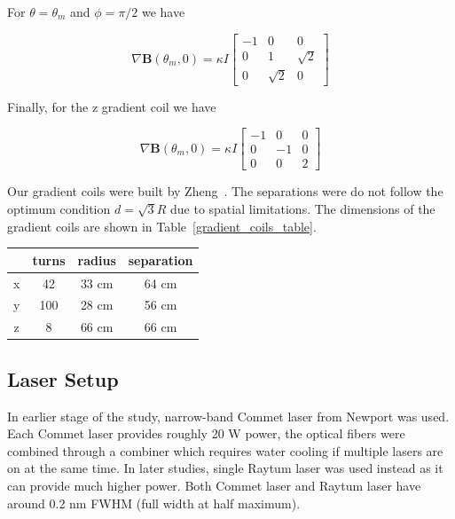 For $\theta=\theta_m$ and $\phi=\pi/2$ we have

\begin{equation}
\nabla\boldsymbol{B}(\theta_m, 0)=\kappa I
\begin{bmatrix}
-1 & 0 & 0\\
0 & 1 & \sqrt{2}\\
0 & \sqrt{2} & 0
\end{bmatrix}
\end{equation}

Finally, for the z gradient coil we have

\begin{equation}
\nabla\boldsymbol{B}(\theta_m, 0)=\kappa I
\begin{bmatrix}
-1 & 0 & 0\\
0 & -1 & 0\\
0 & 0 & 2
\end{bmatrix}
\end{equation}

Our gradient coils were built by Zheng~\cite{YuanThesis}. The separations were do not follow the optimum condition $d=\sqrt{3}R$ due to spatial limitations. The dimensions of the gradient coils are shown in Table~\ref{gradient_coils_table}.

\begin{center}
	\begin{tabular}{ | c | c| c| c | }
		\hline
		& turns & radius & separation \\ \hline
		x & 42 & 33 cm & 64 cm \\ \hline 
		y & 100 & 28 cm & 56 cm \\ \hline
		z & 8 & 66 cm & 66 cm \\
		\hline
	\end{tabular}
\end{center}\label{gradient_coils_table}

\subsection{Laser Setup}

In earlier stage of the study, narrow-band Commet laser from Newport was used. Each Commet laser provides roughly 20 W power, the optical fibers were combined through a combiner which requires water cooling if multiple lasers are on at the same time. In later studies, single Raytum laser was used instead as it can provide much higher power. Both Commet laser and Raytum laser have around 0.2 nm FWHM (full width at half maximum).

